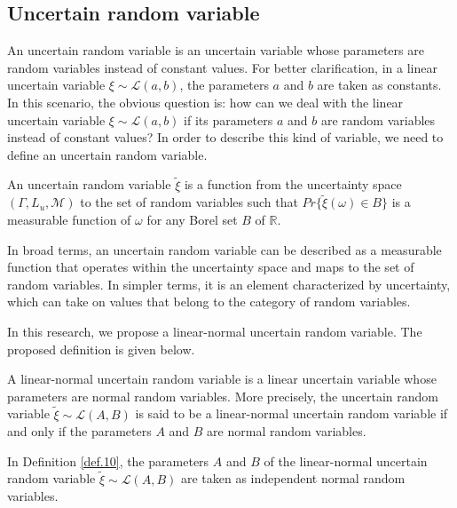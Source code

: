 \subsection{Uncertain random variable}
An uncertain random variable is an uncertain variable whose parameters are random variables instead of constant values. For better clarification, in a linear uncertain variable $\xi\sim \mathcal{L}(a,b)$, the parameters $a$ and $b$ are taken as constants. In this scenario, the obvious question is: how can we deal with the linear uncertain variable $\xi\sim \mathcal{L}(a,b)$ if its parameters $a$ and $b$ are random variables instead of constant values? In order to describe this kind of variable, we need to define an uncertain random variable.
\begin{definition}\label{def.9}
	An uncertain random variable $\tilde{\xi}$ is a function from the uncertainty space $(\Gamma,L_u,\mathcal{M})$ to the set of random variables such that $Pr\{\tilde{\xi}(\omega)\in B\}$ is a measurable function of $\omega$ for any Borel set $B$ of $\mathbb{R}.$
\end{definition}
\begin{remark}
	In broad terms, an uncertain random variable can be described as a measurable function that operates within the uncertainty space and maps to the set of random variables. In simpler terms, it is an element characterized by uncertainty, which can take on values that belong to the category of random variables.
	\end{remark}
\par In this research, we propose a linear-normal uncertain random variable. The proposed definition is given below.
\begin{definition}\label{def.10}
	A linear-normal uncertain random variable is a linear uncertain variable whose parameters are normal random variables. More precisely, the uncertain random variable $\tilde{\xi}\sim \mathcal{L}(A,B)$ is said to be a linear-normal uncertain random variable if and only if the parameters $A$ and $B$ are normal random variables. 
\end{definition}
\begin{remark}
In Definition \ref{def.10}, the parameters $A$ and $B$ of the linear-normal uncertain random variable $\tilde{\xi}\sim \mathcal{L}(A,B)$ are taken as independent normal random variables.
\end{remark}	
